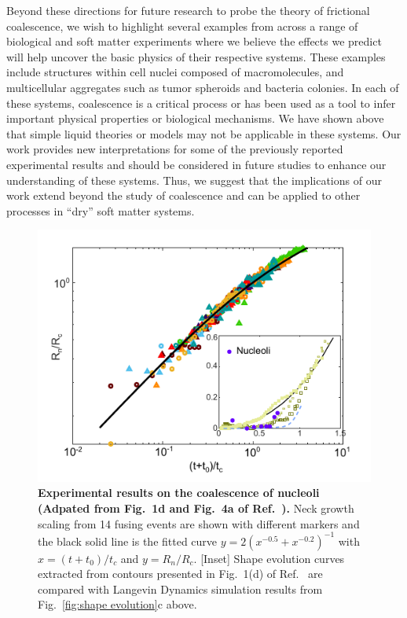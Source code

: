 \documentclass[%
reprint,
amsmath,amssymb,
aps,
]{revtex4-2}
\begin{document}
	Beyond these directions for future research to probe the theory of frictional coalescence, we wish to highlight several examples from across a range of biological and soft matter experiments where we believe the effects we predict will help uncover the basic physics of their respective systems. These examples include structures within cell nuclei composed of macromolecules, and multicellular aggregates such as tumor spheroids and bacteria colonies. In each of these systems, coalescence is a critical process or has been used as a tool to infer important physical properties or biological mechanisms. We have shown above that simple liquid theories or models may not be applicable in these systems. Our work provides new interpretations for some of the previously reported experimental results and should be considered in future studies to enhance our understanding of these systems. Thus, we suggest that the implications of our work extend beyond the study of coalescence and can be applied to other processes in ``dry'' soft matter systems.
	\begin{figure}[h]
		\centering
		\includegraphics[width=\columnwidth]{Figure8.pdf}
		\caption{\textbf{Experimental results on the coalescence of nucleoli (Adpated from Fig.~1d and Fig.~4a of Ref.~\cite{caragineSurfaceFluctuationsCoalescence2018a}).} Neck growth scaling from 14 fusing events are shown with different markers and the black solid line is the fitted curve $y = 2(x^{-0.5}+x^{-0.2})^{-1}$ with $x=(t+t_0)/t_c$ and $y=R_n/R_c$. [Inset] Shape evolution curves extracted from contours presented in Fig.~1(d) of Ref.~\cite{caragineSurfaceFluctuationsCoalescence2018a} are compared with Langevin Dynamics simulation results from Fig.~\ref{fig:shape evolution}c above.}
		\label{fig:nucleoli}
	\end{figure}
	
\end{document}

